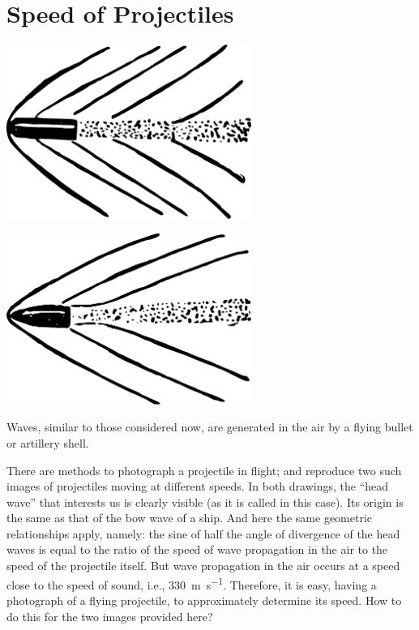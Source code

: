 \section{Speed of Projectiles}
\label{sec-2.14}
\begin{marginfigure}%
\centering
\includegraphics[width=0.6\textwidth]{figures/ch-02/fig-050.pdf}
\end{marginfigure}

\begin{marginfigure}[3cm]%
\centering
\includegraphics[width=0.6\textwidth]{figures/ch-02/fig-051.pdf}
\end{marginfigure}

\ques Waves, similar to those considered now, are generated in the air by a flying bullet or artillery shell.

There are methods to photograph a projectile in flight;  and  reproduce two such images of projectiles moving at different speeds. In both drawings, the ``head wave'' that interests us is clearly visible (as it is called in this case). Its origin is the same as that of the bow wave of a ship. And here the same geometric relationships apply, namely: the sine of half the angle of divergence of the head waves is equal to the ratio of the speed of wave propagation in the air to the speed of the projectile itself. But wave propagation in the air occurs at a speed close to the speed of sound, i.e., \SI{330}{\meter\per\second}. Therefore, it is easy, having a photograph of a flying projectile, to approximately determine its speed. How to do this for the two images provided here?

